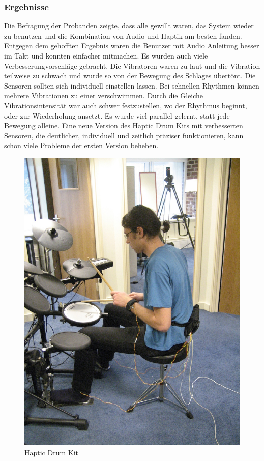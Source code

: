 \documentclass[ngerman,runningheads,a4paper]{llncs}
\begin{document}
\subsubsection{Ergebnisse}
Die Befragung der Probanden zeigte, dass alle gewillt waren, das System wieder zu benutzen und die Kombination von Audio und Haptik am besten fanden.
Entgegen dem gehofften Ergebnis waren die Benutzer mit Audio Anleitung besser im Takt und konnten einfacher mitmachen.
Es wurden auch viele Verbesserungvorschläge gebracht.
Die Vibratoren waren zu laut und die Vibration teilweise zu schwach und wurde so von der Bewegung des Schlages übertönt.
Die Sensoren sollten sich individuell einstellen lassen.
Bei schnellen Rhythmen können mehrere Vibrationen zu einer verschwimmen.
Durch die Gleiche Vibrationsintensität war auch schwer festzustellen, wo der Rhythmus beginnt, oder zur Wiederholung ansetzt.
Es wurde viel parallel gelernt, statt jede Bewegung alleine.
Eine neue Version des Haptic Drum Kits mit verbesserten Sensoren, die deutlicher, individuell und zeitlich präziser funktionieren, kann schon viele Probleme der ersten Version beheben.

\begin{figure}
  \includegraphics[width = \textwidth]{pictures/hapticdrumkit}
  \caption{Haptic Drum Kit \cite{10.1145/1709886.1709892}}
\end{figure}
\end{document}
